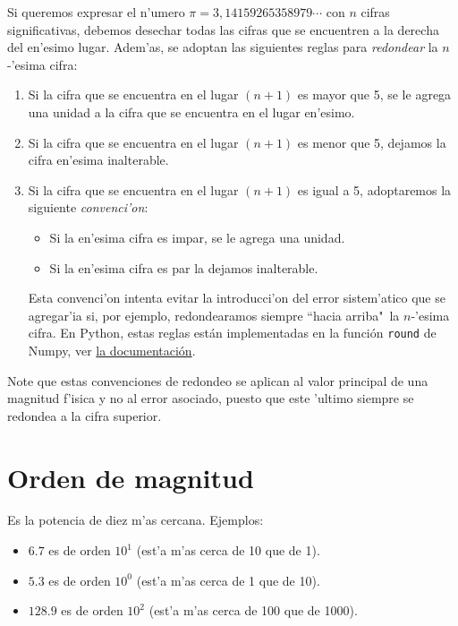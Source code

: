 \documentclass[letterpaper,11pt]{report}
\begin{document}
Si queremos expresar el n'umero $\pi=3,14159265358979\cdots$ con $n$
cifras significativas, debemos desechar todas las cifras que se
encuentren a la derecha del en'esimo lugar. Adem'as, se adoptan las siguientes reglas para \emph{redondear} la $n$-'esima cifra:
\begin{enumerate}
\item Si la cifra que se encuentra en el lugar $(n + 1)$ es mayor que 5, se
  le agrega una unidad a la cifra que se encuentra en el lugar en'esimo.
\item Si la cifra que se encuentra en el lugar $(n + 1)$ es menor que 5,
  dejamos la cifra en'esima inalterable.
\item Si la cifra que se encuentra en el lugar $(n + 1)$ es igual a 5,
  adoptaremos la siguiente \textit{convenci'on}:
	\begin{itemize}
	\item Si la en'esima cifra es impar, se le agrega una unidad.
	\item Si la en'esima cifra es par la dejamos inalterable.
	\end{itemize}
Esta convenci'on intenta evitar la introducci'on del error sistem'atico que se agregar'ia si, por ejemplo, redondearamos siempre ``hacia arriba"\, la $n$-'esima cifra. En Python, estas reglas están implementadas en la función \texttt{round} de Numpy, ver \href{https://docs.scipy.org/doc/numpy/reference/generated/numpy.round_.html}{la documentaci\'on}.
\end{enumerate}

Note que estas convenciones de redondeo se aplican al valor principal de una magnitud f'isica y no al error asociado, puesto que este 'ultimo siempre se redondea a la cifra superior.

\section{Orden de magnitud}
Es la potencia de diez m'as cercana. 
Ejemplos:
\begin{itemize}
\item $6.7$ es de orden $10^1$ (est'a m'as cerca de 10 que de 1).
\item $5.3$ es de orden $10^0$ (est'a m'as cerca de 1 que de 10).
\item $128.9$ es de orden $10^2$ (est'a m'as cerca de 100 que de 1000).
\end{itemize}
\end{document}
